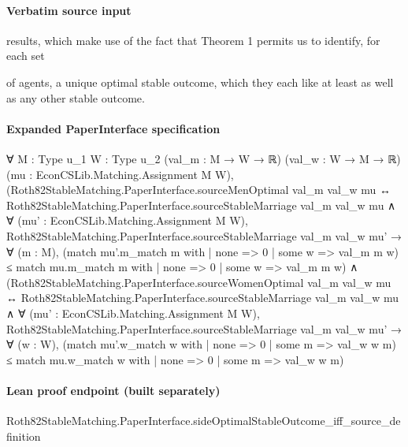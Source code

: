 \documentclass[10pt]{article}
\begin{document}
\paragraph{Verbatim source input}
\begin{ReviewVerbatim}
results, which make use of the fact that Theorem 1 permits us to identify, for each set

of agents, a unique optimal stable outcome, which they each like at least as well as any
other stable outcome.
\end{ReviewVerbatim}


\paragraph{Expanded PaperInterface specification}
\begin{ReviewVerbatim}
∀ {M : Type u_1} {W : Type u_2} (val_m : M → W → ℝ) (val_w : W → M → ℝ) (mu : EconCSLib.Matching.Assignment M W),
  (Roth82StableMatching.PaperInterface.sourceMenOptimal val_m val_w mu ↔
      Roth82StableMatching.PaperInterface.sourceStableMarriage val_m val_w mu ∧
        ∀ (mu' : EconCSLib.Matching.Assignment M W),
          Roth82StableMatching.PaperInterface.sourceStableMarriage val_m val_w mu' →
            ∀ (m : M),
              (match mu'.m_match m with
                | none => 0
                | some w => val_m m w) ≤
                match mu.m_match m with
                | none => 0
                | some w => val_m m w) ∧
    (Roth82StableMatching.PaperInterface.sourceWomenOptimal val_m val_w mu ↔
      Roth82StableMatching.PaperInterface.sourceStableMarriage val_m val_w mu ∧
        ∀ (mu' : EconCSLib.Matching.Assignment M W),
          Roth82StableMatching.PaperInterface.sourceStableMarriage val_m val_w mu' →
            ∀ (w : W),
              (match mu'.w_match w with
                | none => 0
                | some m => val_w w m) ≤
                match mu.w_match w with
                | none => 0
                | some m => val_w w m)
\end{ReviewVerbatim}

\paragraph{Lean proof endpoint (built separately)}\begin{ReviewVerbatim}
Roth82StableMatching.PaperInterface.sideOptimalStableOutcome_iff_source_definition
\end{ReviewVerbatim}
\end{document}
